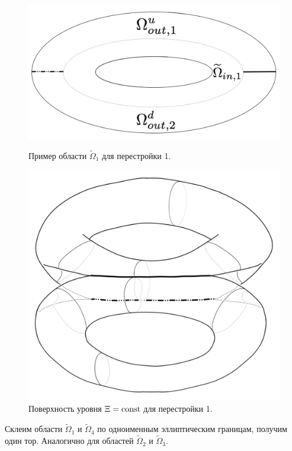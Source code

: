 \begin{figure}[!htb]
\centering
\includegraphics[scale=0.125]{images/ch4/section2/atoms/domain_atom_ell_foc.pdf}
    \caption{Пример области $\widetilde{\Omega}_1$ для перестройки 1.}
    \label{fig:pt9:_domain_atom_ell_foc}
\endminipage\hfill
{}
\centering
\includegraphics[scale=0.125]{images/ch4/section2/atoms/atom1_result.pdf}
    \caption{Поверхность уровня $\Xi=\mathrm{const}$ для перестройки 1.}
    \label{fig:pt9:_atom1_result}
\endminipage\hfill
\end{figure}


Склеим области $\widetilde{\Omega}_1$ и $\widetilde{\Omega}_4$ по одноименным эллиптическим границам, получим один тор. Аналогично для областей $\widetilde{\Omega}_2$ и $\widetilde{\Omega}_3$.

